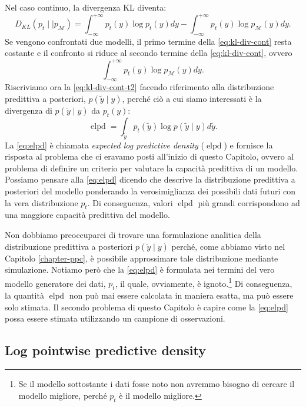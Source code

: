\documentclass[
  10pt,
  italian,
  a4paper,
  extrafontsizes,onecolumn,openright
  ]{memoir}
\DeclareMathOperator{\elpd}{elpd} %
\theoremstyle{definition}
\theoremstyle{definition}
\theoremstyle{definition}
\theoremstyle{definition}
\theoremstyle{remark}
\begin{document}
Nel caso continuo, la divergenza KL diventa:
\begin{equation}
D_{KL}(p_t \mid\mid p_{\mathcal{M}}) = \int_{-\infty}^{+\infty}p_{t}(y)\log p_{t}(y) dy - \int_{-\infty}^{+\infty}p_{t}(y)\log p_{\mathcal{M}}(y) dy.
\label{eq:kl-div-cont}
\end{equation}
Se vengono confrontati due modelli, il primo termine della \eqref{eq:kl-div-cont} resta costante e il confronto si riduce al secondo termine della \eqref{eq:kl-div-cont}, ovvero
\begin{equation}
\int_{-\infty}^{+\infty}p_{t}(y)\log p_{\mathcal{M}}(y) dy.
\label{eq:kl-div-cont-t2}
\end{equation}
\noindent
Riscriviamo ora la \eqref{eq:kl-div-cont-t2} facendo riferimento alla distribuzione predittiva a posteriori, \(p(\tilde{y} \mid y)\), perché ciò a cui siamo interessati è la divergenza di \(p(\tilde{y} \mid y)\) da \(p_{t}(y)\):
\begin{equation}
\elpd = \int_{\tilde{y}} p_{t}(\tilde{y}) \log p(\tilde{y} \mid y) d\tilde{y}.
\label{eq:elpd}
\end{equation}
La \eqref{eq:elpd} è chiamata \emph{expected log predictive density} (\(\elpd\)) e fornisce la risposta al problema che ci eravamo posti all'inizio di questo Capitolo, ovvero al problema di definire un criterio per valutare la capacità predittiva di un modello. Possiamo pensare alla \eqref{eq:elpd} dicendo che descrive la distribuzione predittiva a posteriori del modello ponderando la verosimiglianza dei possibili dati futuri con la vera distribuzione \(p_t\). Di conseguenza, valori \(\elpd\) più grandi corrispondono ad una maggiore capacità predittiva del modello.

Non dobbiamo preoccuparci di trovare una formulazione analitica della distribuzione predittiva a posteriori \(p(\tilde{y} \mid y)\) perché, come abbiamo visto nel Capitolo \ref{chapter-ppc}, è possibile approssimare tale distribuzione mediante simulazione. Notiamo però che la \eqref{eq:elpd} è formulata nei termini del vero modello generatore dei dati, \(p_t\), il quale, ovviamente, è ignoto.\footnote{Se il modello sottostante i dati fosse noto non avremmo bisogno di cercare il modello migliore, perché \(p_t\) è il modello migliore.} Di conseguenza, la quantità \(\elpd\) non può mai essere calcolata in maniera esatta, ma può essere solo stimata. Il secondo problema di questo Capitolo è capire come la \eqref{eq:elpd} possa essere stimata utilizzando un campione di osservazioni.

\hypertarget{log-pointwise-predictive-density}{%
\subsection{Log pointwise predictive density}\label{log-pointwise-predictive-density}}
\end{document}
